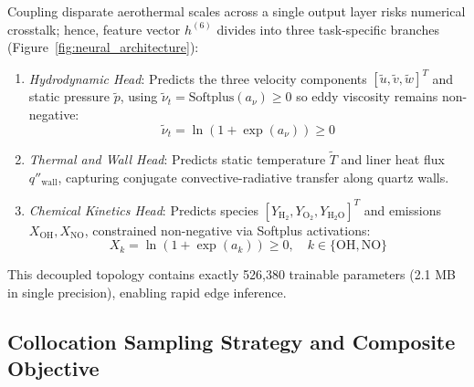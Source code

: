\documentclass[reprint,aps,prfluids,superscriptaddress,twocolumn,floatfix]{revtex4-2}
\begin{document}
Coupling disparate aerothermal scales across a single output layer risks numerical crosstalk; hence, feature vector $h^{(6)}$ divides into three task-specific branches (Figure~\ref{fig:neural_architecture}):
\begin{enumerate}
    \item \textit{Hydrodynamic Head}: Predicts the three velocity components $[\tilde{u}, \tilde{v}, \tilde{w}]^T$ and static pressure $\tilde{p}$, using $\tilde{\nu}_t = \text{Softplus}(a_\nu) \ge 0$ so eddy viscosity remains non-negative:
    \begin{equation}
        \tilde{\nu}_t = \ln(1 + \exp(a_\nu)) \ge 0
        \label{eq:softplus_nut}
    \end{equation}
    \item \textit{Thermal and Wall Head}: Predicts static temperature $\tilde{T}$ and liner heat flux $q''_{\text{wall}}$, capturing conjugate convective-radiative transfer along quartz walls.
    \item \textit{Chemical Kinetics Head}: Predicts species $[Y_{\text{H}_2}, Y_{\text{O}_2}, Y_{\text{H}_2\text{O}}]^T$ and emissions $X_{\text{OH}}, X_{\text{NO}}$, constrained non-negative via Softplus activations:
    \begin{equation}
        X_k = \ln(1 + \exp(a_k)) \ge 0, \quad k \in \{\text{OH}, \text{NO}\}
        \label{eq:softplus_species}
    \end{equation}
\end{enumerate}
This decoupled topology contains exactly 526,380 trainable parameters (2.1 MB in single precision), enabling rapid edge inference.

\subsection{Collocation Sampling Strategy and Composite Objective}
\label{subsec:collocation_sampling}
\end{document}
